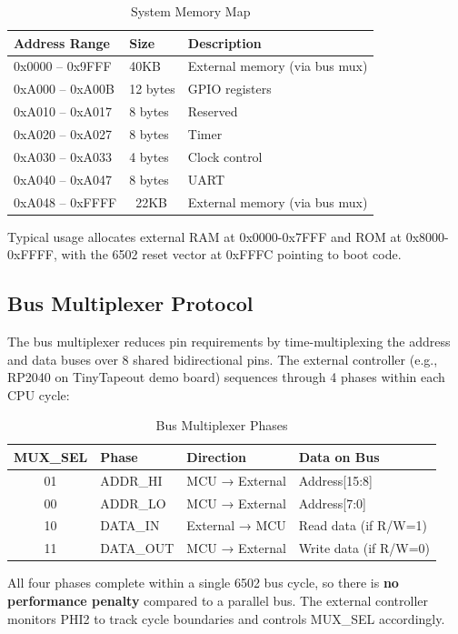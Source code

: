 \documentclass[11pt,a4paper]{article}
\begin{document}
\begin{table}[H]
\centering
\begin{tabular}{lll}
\toprule
\textbf{Address Range} & \textbf{Size} & \textbf{Description} \\
\midrule
0x0000 -- 0x9FFF & 40KB & External memory (via bus mux) \\
0xA000 -- 0xA00B & 12 bytes & GPIO registers \\
0xA010 -- 0xA017 & 8 bytes & Reserved \\
0xA020 -- 0xA027 & 8 bytes & Timer \\
0xA030 -- 0xA033 & 4 bytes & Clock control \\
0xA040 -- 0xA047 & 8 bytes & UART \\
0xA048 -- 0xFFFF & ~22KB & External memory (via bus mux) \\
\bottomrule
\end{tabular}
\caption{System Memory Map}
\end{table}

Typical usage allocates external RAM at 0x0000-0x7FFF and ROM at 0x8000-0xFFFF, with the 6502 reset vector at 0xFFFC pointing to boot code.

\subsection{Bus Multiplexer Protocol}

The bus multiplexer reduces pin requirements by time-multiplexing the address and data buses over 8 shared bidirectional pins. The external controller (e.g., RP2040 on TinyTapeout demo board) sequences through 4 phases within each CPU cycle:

\begin{table}[H]
\centering
\begin{tabular}{clll}
\toprule
\textbf{MUX\_SEL} & \textbf{Phase} & \textbf{Direction} & \textbf{Data on Bus} \\
\midrule
01 & ADDR\_HI & MCU → External & Address[15:8] \\
00 & ADDR\_LO & MCU → External & Address[7:0] \\
10 & DATA\_IN & External → MCU & Read data (if R/W=1) \\
11 & DATA\_OUT & MCU → External & Write data (if R/W=0) \\
\bottomrule
\end{tabular}
\caption{Bus Multiplexer Phases}
\end{table}

All four phases complete within a single 6502 bus cycle, so there is \textbf{no performance penalty} compared to a parallel bus. The external controller monitors PHI2 to track cycle boundaries and controls MUX\_SEL accordingly.
\end{document}
